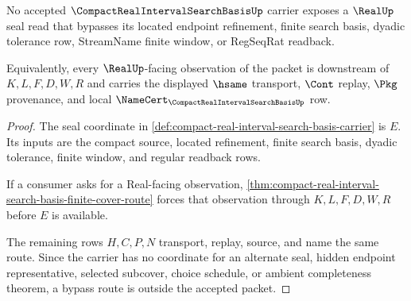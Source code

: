 \begin{theorem}
\label{thm:compact-real-interval-search-basis-real-seal-nonescape}
No accepted $\CompactRealIntervalSearchBasisUp$ carrier exposes a $\RealUp$ seal read that bypasses its located endpoint refinement, finite search basis, dyadic tolerance row, StreamName finite window, or RegSeqRat readback.

Equivalently, every $\RealUp$-facing observation of the packet is downstream of $K,L,F,D,W,R$ and carries the displayed $\hsame$ transport, $\Cont$ replay, $\Pkg$ provenance, and local $\NameCert_{\CompactRealIntervalSearchBasisUp}$ row.
\end{theorem}
\begin{proof}
The seal coordinate in \autoref{def:compact-real-interval-search-basis-carrier} is $E$. Its inputs are the compact source, located refinement, finite search basis, dyadic tolerance, finite window, and regular readback rows.

If a consumer asks for a Real-facing observation, \autoref{thm:compact-real-interval-search-basis-finite-cover-route} forces that observation through $K,L,F,D,W,R$ before $E$ is available.

The remaining rows $H,C,P,N$ transport, replay, source, and name the same route. Since the carrier has no coordinate for an alternate seal, hidden endpoint representative, selected subcover, choice schedule, or ambient completeness theorem, a bypass route is outside the accepted packet.
\end{proof}

